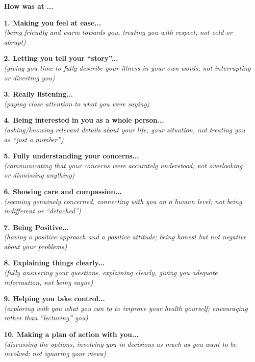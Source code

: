 \begin{small}

	\begin{tcolorbox}[boxrule=1pt]
		\begin{center}
			{\large \textbf{How was \sysname at ...}}
		\end{center}

	\end{tcolorbox}

	\vspace{1em}


	\noindent \textbf{1. Making you feel at ease...} \\
	\textit{(being friendly and warm towards you, treating you with respect; not cold or abrupt)}
	\ratingTable

	\noindent \textbf{2. Letting you tell your ``story''...} \\
	\textit{(giving you time to fully describe your illness in your own words; not interrupting or diverting you)}
	\ratingTable

	\noindent \textbf{3. Really listening...} \\
	\textit{(paying close attention to what you were saying)}
	\ratingTable

	\noindent \textbf{4. Being interested in you as a whole person...} \\
	\textit{(asking/knowing relevant details about your life, your situation, not treating you as ``just a number'')}
	\ratingTable


	\noindent \textbf{5. Fully understanding your concerns...} \\
	\textit{(communicating that your concerns were accurately understood; not overlooking or dismissing anything)}
	\ratingTable

	\noindent \textbf{6. Showing care and compassion...} \\
	\textit{(seeming genuinely concerned, connecting with you on a human level; not being indifferent or ``detached'')}
	\ratingTable

	\noindent \textbf{7. Being Positive...} \\
	\textit{(having a positive approach and a positive attitude; being honest but not negative about your problems)}
	\ratingTable

	\noindent \textbf{8. Explaining things clearly...} \\
	\textit{(fully answering your questions, explaining clearly, giving you adequate information, not being vague)}
	\ratingTable

	\noindent \textbf{9. Helping you take control...} \\
	\textit{(exploring with you what you can to to improve your health yourself; encouraging rather than ``lecturing'' you)}
	\ratingTable

	\noindent \textbf{10. Making a plan of action with you...} \\
	\textit{(discussing the options, involving you in decisions as much as you want to be involved; not ignoring your views)}
	\ratingTable
\end{small}

